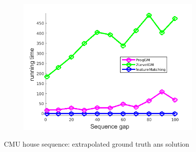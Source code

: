 \documentclass[
	fontsize=12pt,
	paper=a4,
	twoside=false,
	numbers=noenddot,
	plainheadsepline,
	toc=listof,
	toc=bibliography
]{scrartcl}
\begin{document}
\begin{figure}[h]
\begin{subfigure}[b]{0.3\textwidth}
		\includegraphics[scale=0.25]{"fig_ver2608/RealImages/House_seq/no_descr/using_cdf_afftrafo/ext_solution/performance/time"}  
	\end{subfigure} 	
	\caption{CMU house sequence: extrapolated ground truth ans solution}
\end{figure}
\vspace{-20pt}
\end{document}

